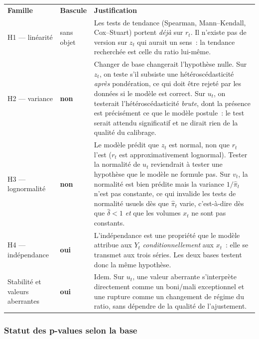 \documentclass[a4paper,11pt]{article}
\begin{document}
\begin{center}
\small
{}
\begin{tabular}{@{}p{2.5cm}p{1.9cm}p{10.4cm}@{}}
\rowcolor{tableheader}
\textcolor{financeblue}{\textbf{Famille}} &
\textcolor{financeblue}{\textbf{Bascule}} &
\textcolor{financeblue}{\textbf{Justification}} \\
H1 --- linéarité & sans objet &
Les tests de tendance (Spearman, Mann--Kendall, Cox--Stuart) portent \emph{déjà}
sur $r_t$. Il n'existe pas de version sur $z_t$ qui aurait un sens~: la tendance
recherchée est celle du ratio lui-même. \\
H2 --- variance & \textbf{non} &
Changer de base changerait l'hypothèse nulle. Sur $z_t$, on teste s'il subsiste
une hétéroscédasticité \emph{après} pondération, ce qui doit être rejeté par les
données si le modèle est correct. Sur $u_t$, on testerait l'hétéroscédasticité
\emph{brute}, dont la présence est précisément ce que le modèle postule~: le
test serait attendu significatif et ne dirait rien de la qualité du calibrage. \\
H3 --- lognormalité & \textbf{non} &
Le modèle prédit que $z_t$ est normal, non que $r_t$ l'est ($r_t$ est
approximativement lognormal). Tester la normalité de $u_t$ reviendrait à tester
une hypothèse que le modèle ne formule pas. Sur $v_t$, la normalité est bien
prédite mais la variance $1/\hat\pi_t$ n'est pas constante, ce qui invalide les
tests de normalité usuels dès que $\hat\pi_t$ varie, c'est-à-dire dès que
$\hat\delta < 1$ \emph{et} que les volumes $x_t$ ne sont pas constants. \\
H4 --- indépendance & \textbf{oui} &
L'indépendance est une propriété que le modèle attribue aux $Y_t$
\emph{conditionnellement} aux $x_t$~: elle se transmet aux trois séries. Les
deux bases testent donc la même hypothèse. \\
Stabilité et valeurs aberrantes & \textbf{oui} &
Idem. Sur $u_t$, une valeur aberrante s'interprète directement comme un
boni/mali exceptionnel et une rupture comme un changement de régime du ratio,
sans dépendre de la qualité de l'ajustement. \\
\end{tabular}
\end{center}

\subsubsection*{Statut des p-values selon la base}
\end{document}
